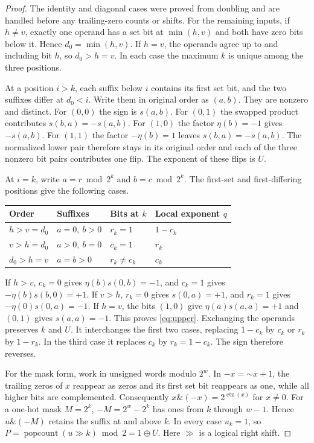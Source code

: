 \documentclass[11pt]{article}
\newcommand{\ctz}{\operatorname{ctz}}
\newcommand{\pc}{\operatorname{popcount}}
\newcommand{\band}{\mathbin{\&}}
\begin{document}
\begin{proof}
The identity and diagonal cases were proved from doubling and are handled
before any trailing-zero counts or shifts. For the remaining inputs, if
\(h\ne v\), exactly one operand has a set bit at \(\min(h,v)\) and
both have zero bits below it. Hence \(d_0=\min(h,v)\). If \(h=v\),
the operands agree up to and including bit \(h\), so \(d_0>h=v\).
In each case the maximum \(k\) is unique among the three positions.

At a position \(i>k\), each suffix below \(i\) contains its first set
bit, and the two suffixes differ at \(d_0<i\). Write them in original
order as \((a,b)\). They are nonzero and distinct. For \((0,0)\) the
sign is \(s(a,b)\). For \((0,1)\) the swapped product contributes
\(s(b,a)=-s(a,b)\). For \((1,0)\) the factor \(\eta(b)=-1\)
gives \(-s(a,b)\). For \((1,1)\) the factor \(-\eta(b)=1\)
leaves \(s(b,a)=-s(a,b)\). The normalized lower pair therefore
stays in its original order and each of the three nonzero bit pairs
contributes one flip. The exponent of these flips is \(U\).

At \(i=k\), write \(a=r\bmod 2^k\) and \(b=c\bmod 2^k\).
The first-set and first-differing positions give the following cases.
\begin{center}
\begin{tabular}{@{}llll@{}}
\toprule
Order & Suffixes & Bits at \(k\) & Local exponent \(q\)\\
\midrule
\(h>v=d_0\) & \(a=0,\ b>0\) & \(r_k=1\) & \(1-c_k\)\\
\(v>h=d_0\) & \(a>0,\ b=0\) & \(c_k=1\) & \(r_k\)\\
\(d_0>h=v\) & \(a=b>0\) & \(r_k\ne c_k\) & \(c_k\)\\
\bottomrule
\end{tabular}
\end{center}
If \(h>v\), \(c_k=0\) gives \(\eta(b)s(0,b)=-1\), and
\(c_k=1\) gives \(-\eta(b)s(b,0)=+1\).
If \(v>h\), \(r_k=0\) gives \(s(0,a)=+1\), and
\(r_k=1\) gives \(-\eta(0)s(0,a)=-1\).
If \(h=v\), the bits \((1,0)\) give \(\eta(a)s(a,a)=+1\)
and \((0,1)\) gives \(s(a,a)=-1\).
This proves \eqref{eq:upper}. Exchanging the operands preserves \(k\)
and \(U\). It interchanges the first two cases, replacing \(1-c_k\)
by \(c_k\) or \(r_k\) by \(1-r_k\). In the third case it replaces
\(c_k\) by \(r_k=1-c_k\). The sign therefore reverses.

For the mask form, work in unsigned words modulo \(2^w\). In
\(-x=\mathord{\sim}x+1\), the trailing zeros of \(x\) reappear as
zeros and its first set bit reappears as one, while all higher bits are
complemented. Consequently \(x\band(-x)=2^{\ctz(x)}\) for
\(x\ne0\). For a one-hot mask \(M=2^k\), \(-M=2^w-2^k\)
has ones from \(k\) through \(w-1\). Hence \(u\band(-M)\)
retains the suffix at and above \(k\). In every case \(u_k=1\),
so \(P=\pc(u\gg k)\bmod 2=1\oplus U\).
Here \(\gg\) is a logical right shift.


\end{proof}
\end{document}
